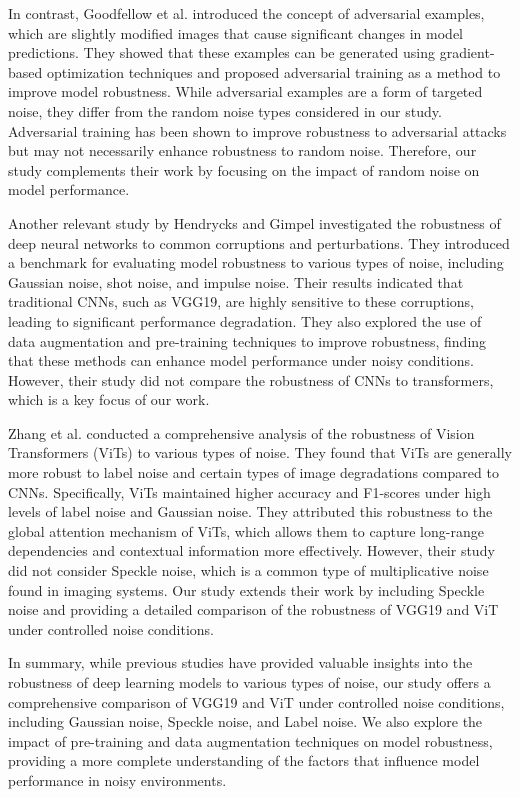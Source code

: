 \documentclass{article}
\begin{document}
In contrast, Goodfellow et al. \cite{goodfellow2014explaining} introduced the concept of adversarial examples, which are slightly modified images that cause significant changes in model predictions. They showed that these examples can be generated using gradient-based optimization techniques and proposed adversarial training as a method to improve model robustness. While adversarial examples are a form of targeted noise, they differ from the random noise types considered in our study. Adversarial training has been shown to improve robustness to adversarial attacks but may not necessarily enhance robustness to random noise. Therefore, our study complements their work by focusing on the impact of random noise on model performance.

Another relevant study by Hendrycks and Gimpel \cite{hendrycks2016baseline} investigated the robustness of deep neural networks to common corruptions and perturbations. They introduced a benchmark for evaluating model robustness to various types of noise, including Gaussian noise, shot noise, and impulse noise. Their results indicated that traditional CNNs, such as VGG19, are highly sensitive to these corruptions, leading to significant performance degradation. They also explored the use of data augmentation and pre-training techniques to improve robustness, finding that these methods can enhance model performance under noisy conditions. However, their study did not compare the robustness of CNNs to transformers, which is a key focus of our work.

Zhang et al. \cite{zhang2021understanding} conducted a comprehensive analysis of the robustness of Vision Transformers (ViTs) to various types of noise. They found that ViTs are generally more robust to label noise and certain types of image degradations compared to CNNs. Specifically, ViTs maintained higher accuracy and F1-scores under high levels of label noise and Gaussian noise. They attributed this robustness to the global attention mechanism of ViTs, which allows them to capture long-range dependencies and contextual information more effectively. However, their study did not consider Speckle noise, which is a common type of multiplicative noise found in imaging systems. Our study extends their work by including Speckle noise and providing a detailed comparison of the robustness of VGG19 and ViT under controlled noise conditions.

In summary, while previous studies have provided valuable insights into the robustness of deep learning models to various types of noise, our study offers a comprehensive comparison of VGG19 and ViT under controlled noise conditions, including Gaussian noise, Speckle noise, and Label noise. We also explore the impact of pre-training and data augmentation techniques on model robustness, providing a more complete understanding of the factors that influence model performance in noisy environments.
\end{document}
